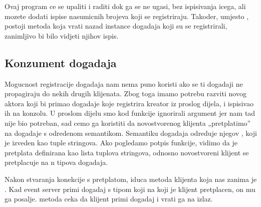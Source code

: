 \documentclass[letterpaper,10pt,croatian]{sphinxmanual}
\begin{document}
\begin{sphinxVerbatim}[commandchars=\\\{\}]
 


   
\end{sphinxVerbatim}

\sphinxAtStartPar
Ovaj program ce se upaliti i raditi dok ga se ne ugasi, bez ispisivanja icega,
ali mozete dodati ispise nasumicnih brojeva koji se registriraju. Takoder,
umjesto , postoji metoda 
koja vrati nazad instance dogadaja koji su se registrirali, zanimljivo bi bilo
vidjeti njihov ispis.


\subsection{Konzument dogadaja}
\label{\detokenize{hat/event_bus:konzument-dogadaja}}
\sphinxAtStartPar
Mogucnost registracije dogadaja nam nema puno koristi ako se ti dogadaji ne
propagiraju do nekih drugih klijenata. Zbog toga imamo potrebu razviti novog
aktora koji bi primao dogadaje koje registrira kreator iz proslog dijela, i
ispisivao ih na konzolu. U proslom dijelu smo kod  funkcije
ignorirali argument  jer nam tad nije bio potreban, sad cemo
ga koristiti da novostvorenog klijenta „pretplatimo” na dogadaje s odredenom
semantikom. Semantiku dogadaja odreduje njegov , koji je izveden
kao tuple stringova. Ako pogledamo potpis 
funkcije, vidimo da je pretplata definirana kao lista tuplova stringova,
odnosno novostvoreni klijent se pretplacuje na n tipova dogadaja.

\sphinxAtStartPar
Nakon stvaranja konekcije s pretplatom, iduca metoda klijenta koja nas zanima
je .
Kad event server primi dogadaj s tipom koji na koji je klijent pretplacen, on
mu ga posalje.  metoda ceka da klijent primi dogadaj i vrati ga na
izlaz.
\end{document}
